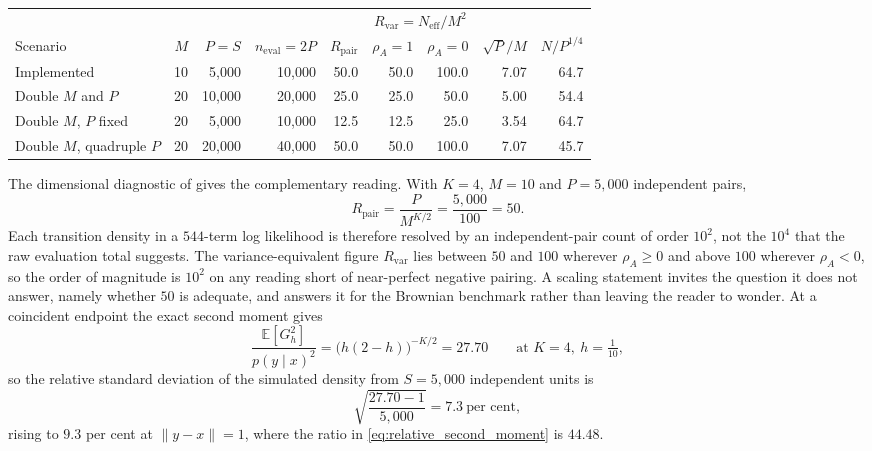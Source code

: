 \documentclass[11pt]{article}
\theoremstyle{definition}
\newcommand{\E}{\mathbb{E}}
\newcommand{\neval}{n_{\mathrm{eval}}}
\begin{document}
\begin{table}[htbp]
\label{tab:design}
\footnotesize
\setlength{\tabcolsep}{4pt}
\begin{tabular}{lrrrrrrrr}
\toprule
& & & & & \multicolumn{2}{c}{$R_{\mathrm{var}}=N_{\mathrm{eff}}/M^2$} & & \\
\cmidrule(lr){6-7}
Scenario & $M$ & $P=S$ & $\neval=2P$ & $R_{\mathrm{pair}}$ & $\rho_A=1$ & $\rho_A=0$ & $\sqrt P/M$ & $N/P^{1/4}$ \\
\midrule
Implemented & 10 & 5{,}000 & 10{,}000 & 50.0 & 50.0 & 100.0 & 7.07 & 64.7 \\
Double $M$ and $P$ & 20 & 10{,}000 & 20{,}000 & 25.0 & 25.0 & 50.0 & 5.00 & 54.4 \\
Double $M$, $P$ fixed & 20 & 5{,}000 & 10{,}000 & 12.5 & 12.5 & 25.0 & 3.54 & 64.7 \\
Double $M$, quadruple $P$ & 20 & 20{,}000 & 40{,}000 & 50.0 & 50.0 & 100.0 & 7.07 & 45.7 \\
\bottomrule
\end{tabular}
\end{table}

The dimensional diagnostic of  gives the complementary reading. With $K=4$, $M=10$ and $P=5{,}000$ independent pairs,
\begin{equation}\label{eq:implemented_effective_size}
R_{\mathrm{pair}}=\frac{P}{M^{K/2}}=\frac{5{,}000}{100}=50 .
\end{equation}
Each transition density in a $544$-term log likelihood is therefore resolved by an independent-pair count of order $10^2$, not the $10^4$ that the raw evaluation total suggests. The variance-equivalent figure $R_{\mathrm{var}}$ lies between $50$ and $100$ wherever $\rho_A\ge0$ and above $100$ wherever $\rho_A<0$, so the order of magnitude is $10^2$ on any reading short of near-perfect negative pairing. A scaling statement invites the question it does not answer, namely whether $50$ is adequate, and  answers it for the Brownian benchmark rather than leaving the reader to wonder. At a coincident endpoint the exact second moment gives
\begin{equation}\label{eq:relative_second_moment}
\frac{\E[G_h^2]}{p(y\mid x)^2}=\bigl(h(2-h)\bigr)^{-K/2}=27.70
\qquad\text{at }K=4,\ h=\tfrac1{10},
\end{equation}
so the relative standard deviation of the simulated density from $S=5{,}000$ independent units is
\[
\sqrt{\frac{27.70-1}{5{,}000}}=7.3\ \text{per cent},
\]
rising to $9.3$ per cent at $\lVert y-x\rVert=1$, where the ratio in \eqref{eq:relative_second_moment} is $44.48$.
\end{document}
